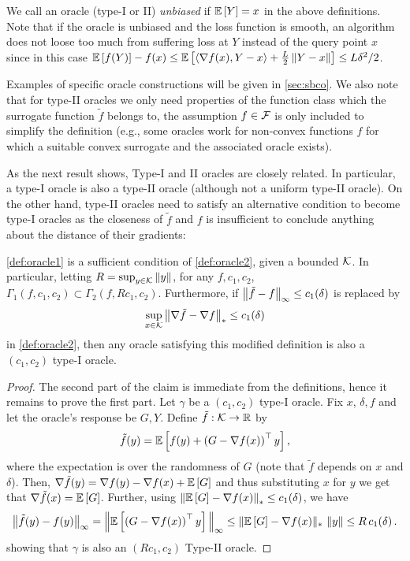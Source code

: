 We call an oracle (type-I or II)  \emph{unbiased} if $\mathbb{E}\left[Y\right]=x$ in the above definitions. Note that if the oracle is unbiased and the loss function is smooth,
 an algorithm does not loose too much from suffering loss at $Y$ instead of the query point $x$
 since in this case $\mathbb{E}\left[f(Y)\right]-f(x) \le \mathbb{E}\left[\langle \nabla f(x), Y-x \rangle+\tfrac{L}{2}\left\|Y-x\right\|\right] \le L\delta^2/2$.

Examples of specific oracle constructions will be given in  \cref{sec:sbco}. We also note that for type-II oracles we only need properties of the function class which the surrogate function $\tilde{f}$ belongs to, the assumption $f \in \mathcal{F}$ is only included to simplify the definition (e.g., some oracles work for non-convex functions $f$ for which a suitable convex surrogate and the associated oracle exists).

As the next result shows, Type-I and II oracles are closely related.
In particular, a type-I oracle is also a type-II oracle (although not a uniform type-II oracle). On the other hand, type-II oracles need to satisfy an alternative condition to become type-I oracles as the closeness of $\tilde{f}$ and $f$ is insufficient to conclude anything about the distance of their gradients:
\begin{proposition}\label{thm:typered}
\cref{def:oracle1} is a sufficient condition of \cref{def:oracle2}, given a bounded $\mathcal{K}$. 
In particular, letting $R = \sup_{y \in \mathcal{K}}\left\|y\right\|$, 
for any $f,c_1,c_2$, $\Gamma_1(f,c_1,c_2) \subset \Gamma_2(f,Rc_1,c_2)$. 
Furthermore, if $\big\|\tilde{f}-f\big\|_\infty \le c_1(\delta)$ is replaced by 
\begin{align}
\label{eq:oracle2alt}
\sup_{x\in \mathcal{K}}\big\|\nabla \tilde{f}- \nabla f\big\|_* \le c_1(\delta)
\end{align}
in \cref{def:oracle2}, then any oracle satisfying this modified definition  is also a $(c_1,c_2)$ type-I oracle.
\end{proposition}

\begin{proof}
The second part of the claim is immediate from the definitions, hence it remains to prove the first part.
Let $\gamma$ be  a $(c_1,c_2)$ type-I oracle. Fix $x$, $\delta,f$ and let the oracle's response be $G,Y$. 
Define $\tilde{f}:\mathcal{K} \to \mathbb{R}$ by
\[\tilde{f}(y) =\mathbb{E}\left[ f(y)+ \left( G-\nabla f(x) \right)^\top y\right],\]
where the expectation is over the randomness of $G$ (note that $\tilde{f}$ depends on $x$ and $\delta$).
Then, $\nabla \tilde{f}(y) =  \nabla f(y)-\nabla f(x) + \mathbb{E}\left[G\right]$
and thus substituting $x$ for $y$ we get that $\nabla \tilde{f}(x) = \mathbb{E}\left[G\right]$.
Further, 
using $\left\| \mathbb{E}\left[G\right]  - \nabla f(x)  \right\|_* \le c_1(\delta) $,
we have
\begin{align*}
\big\|\tilde{f}(y)-f(y)\big\|_{\infty}
=
 \Big\| \mathbb{E}\left[\left( G-\nabla f(x) \right)^\top y\right]\Big\|_{\infty}
 \le \large\|\mathbb{E}\left[G\right]-\nabla f(x)\large\|_* \, \left\|y\right\|
 \le  R\,c_1(\delta)\,.
\end{align*}
showing that  $\gamma$ is also an $(Rc_1,c_2)$ Type-II oracle.
\end{proof}



